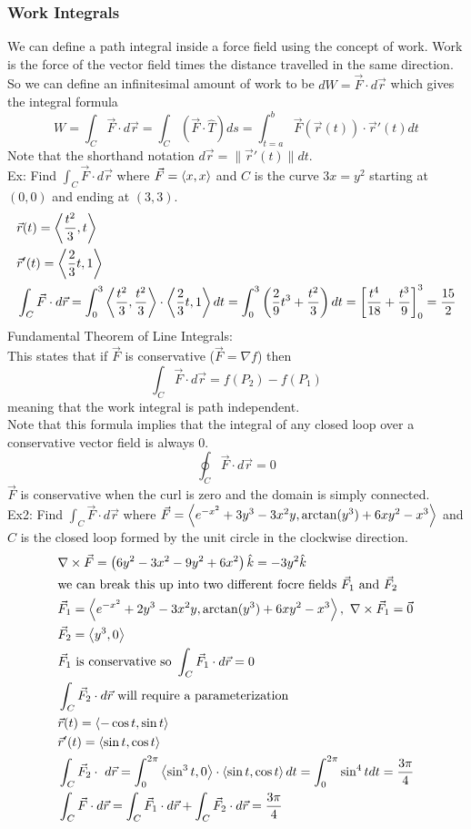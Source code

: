 \documentclass[11pt, fleqn]{article}
\begin{document}
\subsubsection{Work Integrals}
We can define a path integral inside a force field using the concept of work. Work is the force of the vector field times the distance travelled in the same direction. So we can define an infinitesimal amount of work to be $dW=\vec{F}\cdot d\vec{r}$ which gives the integral formula
$$W=\int_C\vec{F}\cdot d\vec{r}=\int_C(\vec{F}\cdot\hat{T})ds=\int_{t=a}^b\vec{F}(\vec{r}(t))\cdot\vec{r}'(t)dt$$
Note that the shorthand notation $d\vec{r}=\|\vec{r}'(t)\|dt$.\\
Ex: Find $\int_C\vec{F}\cdot d\vec{r}$ where $\vec{F}=\left\langle x,x \right\rangle$ and $C$ is the curve $3x=y^2$ starting at $(0,0)$ and ending at $(3,3)$.
\begin{align*}
    &\vec{r}(t)=\left\langle \frac{t^2}{3},t \right\rangle\\
    &\vec{r}'(t)=\left\langle \frac{2}{3}t,1 \right\rangle\\
    &\int_C\vec{F}\cdot d\vec{r}=\int_0^3\left\langle \frac{t^2}{3},\frac{t^2}{3} \right\rangle\cdot\left\langle \frac{2}{3}t,1 \right\rangle dt=\int_0^3\left( \frac{2}{9}t^3+\frac{t^2}{3} \right)dt=\left[ \frac{t^4}{18}+\frac{t^3}{9} \right]_0^3=\frac{15}{2}
\end{align*}
Fundamental Theorem of Line Integrals:\\
This states that if $\vec{F}$ is conservative ($\vec{F}=\nabla f$) then
$$\int_C\vec{F}\cdot d\vec{r}=f(P_2)-f(P_1)$$
meaning that the work integral is path independent.\\
Note that this formula implies that the integral of any closed loop over a conservative vector field is always 0.
$$\oint_C\vec{F}\cdot d\vec{r}=0$$
$\vec{F}$ is conservative when the curl is zero and the domain is simply connected.\\
Ex2: Find $\int_C\vec{F}\cdot d\vec{r}$ where $\vec{F}=\left\langle e^{-x^2}+3y^3-3x^2y,\arctan(y^3)+6xy^2-x^3 \right\rangle$ and $C$ is the closed loop formed by the unit circle in the clockwise direction.
\begin{align*}
    &\nabla\times\vec{F}=\brround{6y^2-3x^2-9y^2+6x^2}\hat{k}=-3y^2\hat{k}\\
    &\text{we can break this up into two different focre fields $\vec{F}_1$ and $\vec{F}_2$}\\
    &\vec{F}_1=\brangle{e^{-x^2}+2y^3-3x^2y,\arctan(y^3)+6xy^2-x^3},\ \nabla\times\vec{F}_1=\vec{0}\\
    &\vec{F}_2=\brangle{y^3,0}\\
    &\vec{F}_1\text{ is conservative so }\int_C\vec{F}_1\cdot d\vec{r}=0\\
    &\int_C\vec{F}_2\cdot d\vec{r}\text{ will require a parameterization}\\
    &\vec{r}(t)=\brangle{-\cos t,\sin t}\\
    &\vec{r}'(t)=\brangle{\sin t,\cos t}\\
    &\int_C\vec{F}_2\cdot\ d\vec{r}=\int_0^{2\pi}\brangle{\sin^3 t,0}\cdot\brangle{\sin t,\cos t}dt=\int_0^{2\pi}\sin^4 tdt=\frac{3\pi}{4}\\
    &\int_C\vec{F}\cdot d\vec{r}=\int_C\vec{F}_1\cdot d\vec{r}+\int_C\vec{F}_2\cdot d\vec{r}=\frac{3\pi}{4}
\end{align*}
\end{document}
